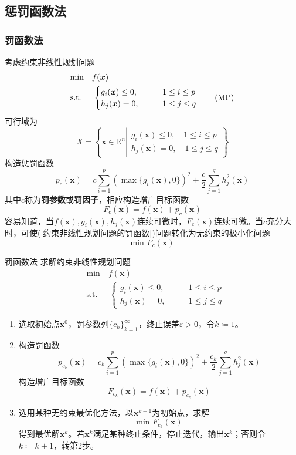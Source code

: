 \documentclass[lang = cn, scheme = chinese, thmcnt = section]{elegantbook}
\newcommand{\R}{\mathbb{R}}            %
\newcommand{\bs}{\boldsymbol}          %
\begin{document}
\subsection{惩罚函数法}

\subsubsection{罚函数法}

考虑约束非线性规划问题
\begin{align*}\label{约束非线性规划问题的罚函数}
	& \text{min}  \quad f(\bs{x})\\
	& \text{s.t.} \;\, \quad \begin{cases}
		g_i(\bs{x})\le 0,\qquad & 1\le i \le p\\
		h_j(\bs{x})=0,\qquad & 1\le j \le q
	\end{cases}\tag{$\text{MP}$}
\end{align*}
可行域为
$$
X=\left\{ 
\bs{x}\in\R^n\left|
\begin{aligned}
	g_i(\bs{x})\le 0,\quad 1\le i \le p\\
	h_j(\bs{x})=0,\quad 1\le j \le q
\end{aligned}\right.
\right\}
$$
构造惩罚函数%
$$
p_c(\bs{x})=
c\sum_{i=1}^{p}(\max\{ g_i(\bs{x}),0 \})^2+\frac{c}{2}\sum_{j=1}^{q}h_j^2(\bs{x})
$$
其中$c$称为\textbf{罚参数}或\textbf{罚因子}，相应构造增广目标函数%
$$
F_c(\bs{x})=f(\bs{x})+p_c(\bs{x})
$$
容易知道，当$f(\bs{x}),g_i(\bs{x}),h_j(\bs{x})$连续可微时，$F_c(\bs{x})$连续可微。当$c$充分大时，可使(\ref{约束非线性规划问题的罚函数})问题转化为无约束的极小化问题%
$$
\text{min }F_c(\bs{x})
$$

\begin{theorem}{罚函数法}
	求解约束非线性规划问题
	\begin{align*}
		& \text{min}  \quad f(\bs{x})\\
		& \text{s.t.} \;\, \quad \begin{cases}
			g_i(\bs{x})\le 0,\qquad & 1\le i \le p\\
			h_j(\bs{x})=0,\qquad & 1\le j \le q
		\end{cases}
	\end{align*}
	\begin{enumerate}
		\item 选取初始点$\bs{x}^0$，罚参数列$\{c_k\}_{k=1}^{\infty}$，终止误差$\varepsilon>0$，令$k\coloneqq1$。
		\item 构造罚函数
		$$
		p_{c_k}(\bs{x})=
		c_k\sum_{i=1}^{p}(\max\{ g_i(\bs{x}),0 \})^2+\frac{c_k}{2}\sum_{j=1}^{q}h_j^2(\bs{x})
		$$
		构造增广目标函数
		$$
		F_{c_k}(\bs{x})=f(\bs{x})+p_{c_k}(\bs{x})
		$$
		\item 选用某种无约束最优化方法，以$\bs{x}^{k-1}$为初始点，求解%
		$$
		\text{min }F_{c_k}(\bs{x})
		$$
		得到最优解$\bs{x}^{k}$。若$\bs{x}^{k}$满足某种终止条件，停止迭代，输出$\bs{x}^k$；否则令$k\coloneqq k+1$，转第2步。
	\end{enumerate}
\end{theorem}
\end{document}
